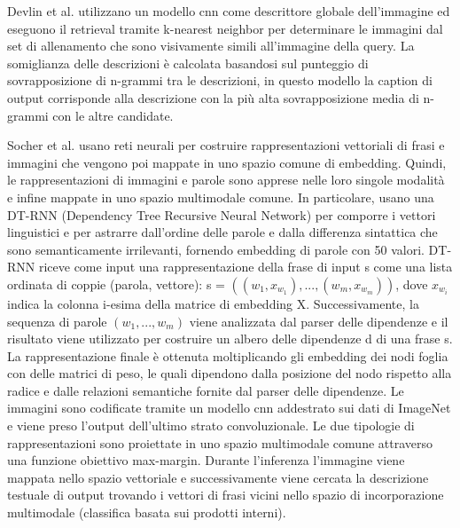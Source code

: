 Devlin et al. \cite{devlin2015language} utilizzano un modello \acrshort{cnn} come descrittore globale dell'immagine ed eseguono il retrieval tramite k-nearest neighbor per determinare le immagini dal set di allenamento che sono visivamente simili all'immagine della query. La somiglianza delle descrizioni è calcolata basandosi sul punteggio di sovrapposizione di n-grammi tra le descrizioni, in questo modello la caption di output corrisponde alla descrizione con la più alta sovrapposizione media di n-grammi con le altre candidate.

Socher et al. \cite{socher2014grounded} usano reti neurali per costruire rappresentazioni vettoriali di frasi e immagini che vengono poi mappate in uno spazio comune di embedding.  Quindi, le rappresentazioni di immagini e parole sono apprese nelle loro singole modalità e infine mappate in uno spazio multimodale comune. In particolare, usano una DT-RNN (Dependency Tree Recursive Neural Network) per comporre i vettori linguistici e per astrarre dall'ordine delle parole e dalla differenza sintattica che sono semanticamente irrilevanti, fornendo embedding di parole con 50 valori.
DT-RNN riceve come input una rappresentazione della frase di input s come una lista ordinata di coppie (parola, vettore): s = $(( w_1, x_{w_1}), . . . , (w_m, x_{w_m}))$, dove $x_{w_i}$ indica la colonna i-esima della matrice di embedding  X. Successivamente, la sequenza di parole $(w_1, . . . , w_m)$ viene analizzata dal parser delle dipendenze e il risultato viene utilizzato per costruire un albero delle dipendenze d di una frase s. La rappresentazione finale è ottenuta moltiplicando gli embedding dei nodi foglia con delle matrici di peso, le quali dipendono dalla posizione del nodo rispetto alla radice e dalle relazioni semantiche fornite dal parser delle dipendenze.
Le immagini sono codificate tramite un modello \acrshort{cnn} addestrato sui dati di ImageNet e viene preso l'output dell'ultimo strato convoluzionale. Le due tipologie di rappresentazioni sono proiettate in uno spazio multimodale comune attraverso una funzione obiettivo max-margin.
Durante l'inferenza l'immagine viene mappata nello spazio vettoriale e successivamente viene cercata la descrizione testuale di output trovando i vettori di frasi vicini nello spazio di incorporazione multimodale (classifica basata sui prodotti interni).

